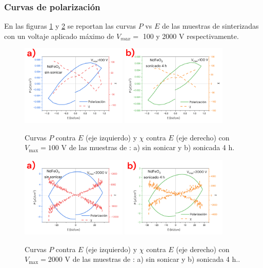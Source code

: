 \documentclass[../main.tex]{subfiles}
\begin{document}
\subsubsection{Curvas de polarización}
En las figuras \ref{fig:nd100v} y \ref{fig:nd2000v} se reportan las curvas $P$ vs $E$ de las muestras de \neod{} sinterizadas con un voltaje aplicado máximo de $V_{max}=$ 100 y 2000 V respectivamente.
\begin{figure}[H]
    \centering
    \includegraphics[width=0.45\textwidth]{fig/PENdFeO3100V.png}
    \quad
    \includegraphics[width=0.45\textwidth]{fig/PENdFeO3-S100V.png}
    \caption{Curvas $P$ contra $E$ (eje izquierdo) y $\chi$ contra $E$ (eje derecho) con $V_\text{max}=100$ V de las muestras de \neod{}: a) sin sonicar y b) sonicada 4 h.}
    \label{fig:nd100v}
\end{figure}
\begin{figure}[H]
    \centering
    \includegraphics[width=0.45\textwidth]{fig/PENdFeO32000V.png}
    \quad
    \includegraphics[width=0.45\textwidth]{fig/PENdFeO3-S2000V.png}
    \caption{Curvas $P$ contra $E$ (eje izquierdo) y $\chi$ contra $E$ (eje derecho) con $V_\text{max}=2000$ V de las muestras de \neod{}: a) sin sonicar y b) sonicada 4 h..}
    \label{fig:nd2000v}
\end{figure}
\end{document}
